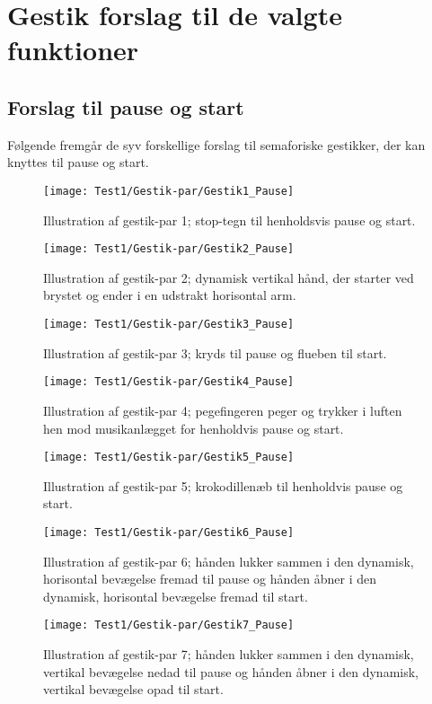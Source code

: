 \chapter{Gestik forslag til de valgte funktioner}
\label{app:GestikForslagFunktioner}
%
\section{Forslag til pause og start}
\label{app:ForslagPauseOgStart}
%
Følgende fremgår de syv forskellige forslag til semaforiske gestikker, der kan knyttes til pause og start.
%
\begin{figure}[H]
	\centering
	\texttt{[image: Test1/Gestik-par/Gestik1\_Pause]}
	\caption{Illustration af gestik-par 1; stop-tegn til henholdsvis pause og start.}
	\label{fig:GestikPar1PauseApp}
\end{figure}
\noindent
%
%
\begin{figure}[H]
	\centering
	\texttt{[image: Test1/Gestik-par/Gestik2\_Pause]}
	\caption{Illustration af gestik-par 2; dynamisk vertikal hånd, der starter ved brystet og ender i en udstrakt horisontal arm.}
	\label{fig:GestikPar2PauseApp}
\end{figure}
\noindent
%
%
\begin{figure}[H]
	\centering
	\texttt{[image: Test1/Gestik-par/Gestik3\_Pause]}
	\caption{Illustration af gestik-par 3; kryds til pause og flueben til start.}
	\label{fig:GestikPar3PauseApp}
\end{figure}
\noindent
%
%
\begin{figure}[H]
	\centering
	\texttt{[image: Test1/Gestik-par/Gestik4\_Pause]}
	\caption{Illustration af gestik-par 4; pegefingeren peger og trykker i luften hen mod musikanlægget for henholdvis pause og start.}
	\label{fig:GestikPar4PauseApp}
\end{figure}
\noindent
%
%
\begin{figure}[H]
	\centering
	\texttt{[image: Test1/Gestik-par/Gestik5\_Pause]}
	\caption{Illustration af gestik-par 5; krokodillenæb til henholdvis pause og start.}
	\label{fig:GestikPar5PauseApp}
\end{figure}
\noindent
%
%
\begin{figure}[H]
	\centering
	\texttt{[image: Test1/Gestik-par/Gestik6\_Pause]}
	\caption{Illustration af gestik-par 6; hånden lukker sammen i den dynamisk, horisontal bevægelse fremad til pause og hånden åbner i den dynamisk, horisontal bevægelse fremad til start.}
	\label{fig:GestikPar6PauseApp}
\end{figure}
\noindent
%
%
\begin{figure}[H]
	\centering
	\texttt{[image: Test1/Gestik-par/Gestik7\_Pause]}
	\caption{Illustration af gestik-par 7; hånden lukker sammen i den dynamisk, vertikal bevægelse nedad til pause og hånden åbner i den dynamisk, vertikal bevægelse opad til start.}
	\label{fig:GestikPar7Pause}
\end{figure}
\noindent
%


